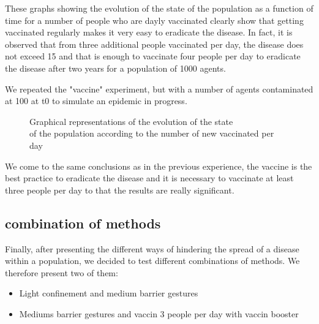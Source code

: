 \documentclass[a4paper, 12pt]{report}
\begin{document}
These graphs showing the evolution of the state of the population as a function of time for a number of people who are dayly vaccinated clearly show that
getting vaccinated regularly makes it very easy to eradicate the disease. In fact, it is observed that from three additional people vaccinated per day, the disease does not exceed 15%
and that is enough to vaccinate four people per day to eradicate the disease after two years for a population of 1000 agents.

\newpage

We repeated the "vaccine" experiment, but with a number of agents contaminated at 100 at t0 to simulate an epidemic in progress.

\begin{figure}[h]
	\centering
	\qquad
	\centering
	\qquad
	\caption{Graphical representations of the evolution of the state \\ of the population according to the number of new vaccinated per day}

\end{figure}

We come to the same conclusions as in the previous experience, the vaccine is the best practice to eradicate the disease and it is necessary to vaccinate at least three people per day to
that the results are really significant.

\newpage

\subsection{combination of methods}

Finally, after presenting the different ways of hindering the spread of a disease within a population, we decided to test different combinations of methods.
We therefore present two of them:

\begin{itemize}
	\item Light confinement and medium barrier gestures
	\item Mediums barrier gestures and vaccin 3 people per day with vaccin booster
\end{itemize}
\end{document}
